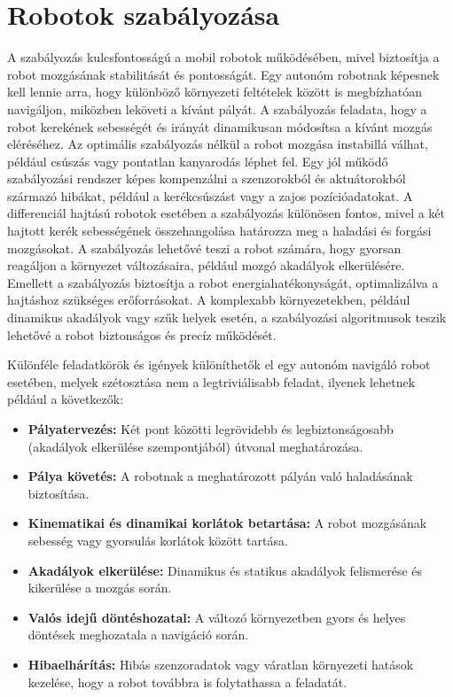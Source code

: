 \section{Robotok szabályozása}
A szabályozás kulcsfontosságú a mobil robotok működésében, mivel biztosítja a robot mozgásának stabilitását és pontosságát. Egy autonóm robotnak képesnek kell lennie arra, hogy különböző környezeti feltételek között is megbízhatóan navigáljon, miközben leköveti a kívánt pályát. A szabályozás feladata, hogy a robot kerekének sebességét és irányát dinamikusan módosítsa a kívánt mozgás eléréséhez. Az optimális szabályozás nélkül a robot mozgása instabillá válhat, például csúszás vagy pontatlan kanyarodás léphet fel. Egy jól működő szabályozási rendszer képes kompenzálni a szenzorokból és aktuátorokból származó hibákat, például a kerékcsúszást vagy a zajos pozícióadatokat. A differenciál hajtású robotok esetében a szabályozás különösen fontos, mivel a két hajtott kerék sebességének összehangolása határozza meg a haladási és forgási mozgásokat. A szabályozás lehetővé teszi a robot számára, hogy gyorsan reagáljon a környezet változásaira, például mozgó akadályok elkerülésére. Emellett a szabályozás biztosítja a robot energiahatékonyságát, optimalizálva a hajtáshoz szükséges erőforrásokat. A komplexabb környezetekben, például dinamikus akadályok vagy szűk helyek esetén, a szabályozási algoritmusok teszik lehetővé a robot biztonságos és precíz működését.

Különféle feladatkörök és igények különíthetők el egy autonóm navigáló robot esetében, melyek szétosztása nem a legtriviálisabb feladat, ilyenek lehetnek például a következők:
\begin{itemize}
    \item \textbf{Pályatervezés:} Két pont közötti legrövidebb és legbiztonságosabb (akadályok elkerülése szempontjából) útvonal meghatározása.
    \item \textbf{Pálya követés:} A robotnak a meghatározott pályán való haladásának biztosítása.
    \item \textbf{Kinematikai és dinamikai korlátok betartása:} A robot mozgásának sebesség vagy gyorsulás korlátok között tartása.
    \item \textbf{Akadályok elkerülése:} Dinamikus és statikus akadályok felismerése és kikerülése a mozgás során.
    \item \textbf{Valós idejű döntéshozatal:} A változó környezetben gyors és helyes döntések meghozatala a navigáció során.
    \item \textbf{Hibaelhárítás:} Hibás szenzoradatok vagy váratlan környezeti hatások kezelése, hogy a robot továbbra is folytathassa a feladatát.
\end{itemize}

